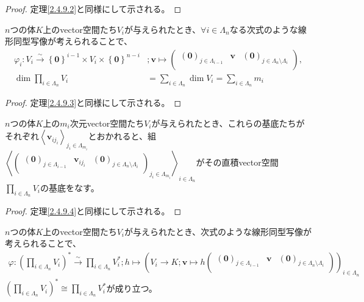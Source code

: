 \documentclass[dvipdfmx]{jsarticle}
\begin{document}
\begin{proof} 定理\ref{2.4.9.2}と同様にして示される。
\end{proof}
\begin{thm}\label{2.4.9.12}
$n$つの体$K$上のvector空間たち$V_{i}$が与えられたとき、$\forall i \in \varLambda_{n}$なる次式のような線形同型写像が考えられることで、
\begin{align*}
\varphi_{i}:V_{i}\overset{\sim}{\rightarrow}\left\{ \mathbf{0} \right\}^{i - 1} \times V_{i} \times \left\{ \mathbf{0} \right\}^{n - i}&;\mathbf{v} \mapsto \begin{pmatrix}
\left( \mathbf{0} \right)_{j \in \varLambda_{i - 1}} & \mathbf{v} & \left( \mathbf{0} \right)_{j \in \varLambda_{n} \setminus \varLambda_{i}} \\
\end{pmatrix},\\
\dim{\prod_{i \in \varLambda_{n}} V_{i}} &= \sum_{i \in \varLambda_{n}} {\dim V_{i}} = \sum_{i \in \varLambda_{n}} m_{i}
\end{align*}
\end{thm}
\begin{proof} 定理\ref{2.4.9.3}と同様にして示される。
\end{proof}
\begin{thm}\label{2.4.9.13}
$n$つの体$K$上の$m_{i}$次元vector空間たち$V_{i}$が与えられたとき、これらの基底たちがそれぞれ$\left\langle \mathbf{v}_{ij_{i}} \right\rangle_{j_{i} \in \varLambda_{m_{i}}}$とおかれると、組$\left\langle \begin{pmatrix}
\left( \mathbf{0} \right)_{j \in \varLambda_{i - 1}} & \mathbf{v}_{ij_{i}} & \left( \mathbf{0} \right)_{j \in \varLambda_{n} \setminus \varLambda_{i}} \\
\end{pmatrix}_{j_{i} \in \varLambda_{m_{i}}} \right\rangle_{i \in \varLambda_{n}}$がその直積vector空間$\prod_{i \in \varLambda_{n}} V_{i}$の基底をなす。
\end{thm}
\begin{proof} 定理\ref{2.4.9.4}と同様にして示される。
\end{proof}
\begin{thm}\label{2.4.9.14}
$n$つの体$K$上のvector空間たち$V_{i}$が与えられたとき、次式のような線形同型写像が考えられることで、
\begin{align*}
\varphi:\left( \prod_{i \in \varLambda_{n}} V_{i} \right)^{*}\overset{\sim}{\rightarrow}\prod_{i \in \varLambda_{n}} V_{i}^{*};h \mapsto \left( V_{i} \rightarrow K;\mathbf{v} \mapsto h\begin{pmatrix}
\left( \mathbf{0} \right)_{j \in \varLambda_{i - 1}} & \mathbf{v} & \left( \mathbf{0} \right)_{j \in \varLambda_{n} \setminus \varLambda_{i}} \\
\end{pmatrix} \right)_{i \in \varLambda_{n}}
\end{align*}
$\left( \prod_{i \in \varLambda_{n}} V_{i} \right)^{*} \cong \prod_{i \in \varLambda_{n}} V_{i}^{*}$が成り立つ。
\end{thm}
\end{document}
